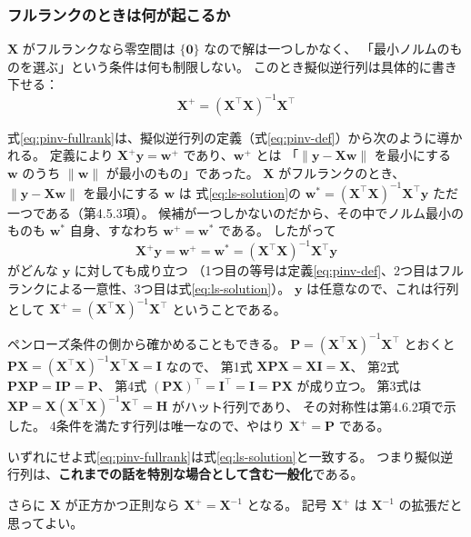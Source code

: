 \subsubsection{フルランクのときは何が起こるか}

$\bm{X}$ がフルランクなら零空間は $\{\bm{0}\}$ なので解は一つしかなく、
「最小ノルムのものを選ぶ」という条件は何も制限しない。
このとき擬似逆行列は具体的に書き下せる：
\begin{equation}
  \bm{X}^{+} = (\bm{X}^\top\bm{X})^{-1}\bm{X}^\top
  \label{eq:pinv-fullrank}
\end{equation}

式\eqref{eq:pinv-fullrank}は、擬似逆行列の定義（式\eqref{eq:pinv-def}）から次のように導かれる。
定義により $\bm{X}^{+}\bm{y} = \bm{w}^{+}$ であり、$\bm{w}^{+}$ とは
「$\|\bm{y} - \bm{X}\bm{w}\|$ を最小にする $\bm{w}$ のうち $\|\bm{w}\|$ が最小のもの」であった。
$\bm{X}$ がフルランクのとき、$\|\bm{y} - \bm{X}\bm{w}\|$ を最小にする $\bm{w}$ は
式\eqref{eq:ls-solution}の $\bm{w}^* = (\bm{X}^\top\bm{X})^{-1}\bm{X}^\top\bm{y}$ ただ一つである（第4.5.3項）。
候補が一つしかないのだから、その中でノルム最小のものも $\bm{w}^*$ 自身、すなわち $\bm{w}^{+} = \bm{w}^*$ である。
したがって
\begin{equation*}
  \bm{X}^{+}\bm{y} = \bm{w}^{+} = \bm{w}^* = (\bm{X}^\top\bm{X})^{-1}\bm{X}^\top\bm{y}
\end{equation*}
がどんな $\bm{y}$ に対しても成り立つ
（1つ目の等号は定義\eqref{eq:pinv-def}、2つ目はフルランクによる一意性、3つ目は式\eqref{eq:ls-solution}）。
$\bm{y}$ は任意なので、これは行列として $\bm{X}^{+} = (\bm{X}^\top\bm{X})^{-1}\bm{X}^\top$ ということである。

ペンローズ条件の側から確かめることもできる。
$\bm{P} = (\bm{X}^\top\bm{X})^{-1}\bm{X}^\top$ とおくと
$\bm{P}\bm{X} = (\bm{X}^\top\bm{X})^{-1}\bm{X}^\top\bm{X} = \bm{I}$ なので、
第1式 $\bm{X}\bm{P}\bm{X} = \bm{X}\bm{I} = \bm{X}$、
第2式 $\bm{P}\bm{X}\bm{P} = \bm{I}\bm{P} = \bm{P}$、
第4式 $(\bm{P}\bm{X})^\top = \bm{I}^\top = \bm{I} = \bm{P}\bm{X}$ が成り立つ。
第3式は $\bm{X}\bm{P} = \bm{X}(\bm{X}^\top\bm{X})^{-1}\bm{X}^\top = \bm{H}$ がハット行列であり、
その対称性は第4.6.2項で示した。
4条件を満たす行列は唯一なので、やはり $\bm{X}^{+} = \bm{P}$ である。

いずれにせよ式\eqref{eq:pinv-fullrank}は式\eqref{eq:ls-solution}と一致する。
つまり擬似逆行列は、\textbf{これまでの話を特別な場合として含む一般化}である。

さらに $\bm{X}$ が正方かつ正則なら $\bm{X}^{+} = \bm{X}^{-1}$ となる。
記号 $\bm{X}^{+}$ は $\bm{X}^{-1}$ の拡張だと思ってよい。

